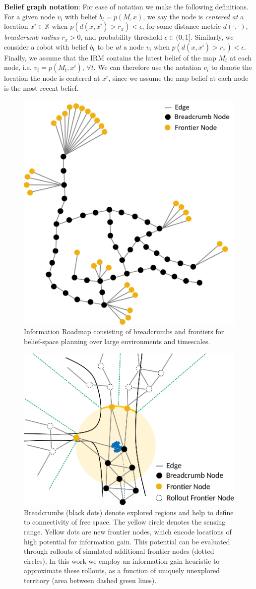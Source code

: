 \documentclass{article}
\newcommand{\ph}[1]{{\textbf{#1}:}} %
\begin{document}
\ph{Belief graph notation}
For ease of notation we make the following definitions.  For a given node $v_i$ with belief $b_i = p(M,x)$, we say the node is \textit{centered at} a location $x^i\in\mathbb{X}$ when $p(d(x,x^i)>r_x)<\epsilon$, for some distance metric $d(\cdot,\cdot)$, \textit{breadcrumb radius} $r_x>0$, and probability threshold $\epsilon\in(0,1]$.  Similarly, we consider a robot with belief $b_t$ to be \textit{at} a node $v_i$ when $p(d(x,x^i)>r_x)<\epsilon$.  Finally, we assume that the IRM contains the latest belief of the map $M_t$ at each node, i.e. $v_i=p(M_t,x^i),\,\forall t$.  We can therefore use the notation $v_i$ to denote the location the node is centered at $x^i$, since we assume the map belief at each node is the most recent belief.

\begin{figure}[ht!]
  \includegraphics[width=.48\textwidth]{figures/irm.png}
  \caption{Information Roadmap consisting of breadcrumbs and frontiers for belief-space planning over large environments and timescales.}
  \label{fig:irm_large}
\end{figure}

\begin{figure}[ht!]
  \includegraphics[width=.48\textwidth]{figures/irm_breadcrumbs_frontiers.png}
  \caption{Breadcrumbs (black dots) denote explored regions and help to define to connectivity of free space.  The yellow circle denotes the sensing range.  Yellow dots are new frontier nodes, which encode locations of high potential for information gain.  This potential can be evaluated through rollouts of simulated additional frontier nodes (dotted circles).  In this work we employ an information gain heuristic to approximate these rollouts, as a function of uniquely unexplored territory (area between dashed green lines).}
  \label{fig:breadcrumbs_frontiers}
\end{figure}
\end{document}

